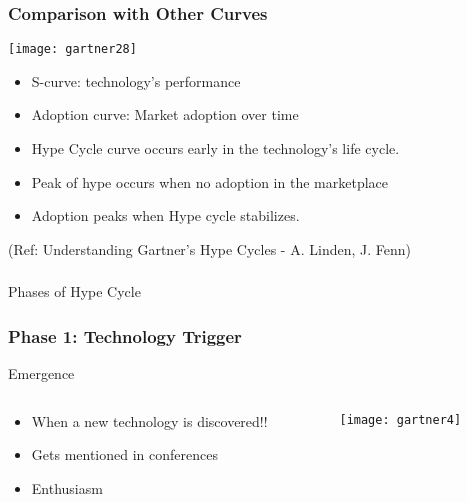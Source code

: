 \begin{frame}[fragile]\frametitle{Comparison with Other Curves}

\begin{center}
\texttt{[image: gartner28]}
\end{center}

\begin{itemize}
\item  S-curve: technology's performance
\item  Adoption curve: Market adoption over time 
\item Hype Cycle curve  occurs early in the technology's life cycle. 
\item Peak of hype occurs when no adoption in the marketplace 
\item Adoption peaks when Hype cycle stabilizes.
\end{itemize}

{\tiny (Ref: Understanding Gartner's Hype Cycles - A. Linden, J. Fenn)}
\end{frame}


\begin{frame}[fragile]\frametitle{}
\begin{center}
{\Large Phases of Hype Cycle}
\end{center}
\end{frame}


\begin{frame}[fragile]\frametitle{Phase 1: Technology Trigger}


Emergence

 \begin{columns}
  \begin{column}{0.55\linewidth}
\begin{itemize}
\item When a new technology is discovered!!
\item Gets mentioned in conferences
\item Enthusiasm
\end{itemize}
  \end{column}%
  \begin{column}{0.45\linewidth}
			\begin{center}
			\texttt{[image: gartner4]}
			\end{center}
  \end{column}
 \end{columns}
 
\end{frame}

